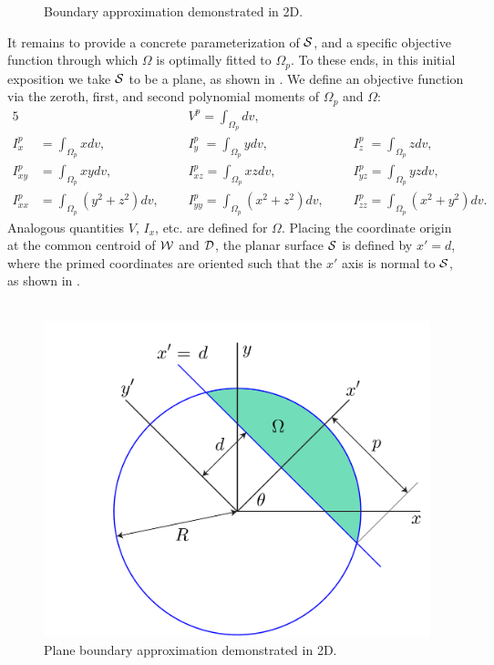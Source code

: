 \begin{figure}[b!]
{		\label{fig:subfigure6}}
	
	\caption{Boundary approximation demonstrated in 2D.}
	\label{fig:figure3}
\end{figure}\noindent
It remains to provide a concrete parameterization of $\mathcal{S}$, and a specific objective function through which $\Omega$ is optimally fitted to $\Omega_p$.  To these ends, in this initial exposition we take $\mathcal{S}$ to be a plane, as shown in . We define an objective function via the zeroth, first, and second polynomial moments of $\Omega_p$ and $\Omega$: 
\begin{alignat}{5}
&{} &&V^p = \int_{\Omega_p}dv, &&{} \\
I_{x\phantom{z}}^p &= \int_{\Omega_p}xdv, &&I_{y\phantom{z}}^p = \int_{\Omega_p}ydv, &&I_{z\phantom{z}}^p = \int_{\Omega_p}zdv, \\
I^p_{xy} &= \int_{\Omega_p}xydv, &&I^p_{xz} = \int_{\Omega_p}xzdv, &&I^p_{yz} = \int_{\Omega_p}yzdv, \\
I^p_{xx} &= \int_{\Omega_p}(y^2 + z^2)dv, \text{\ \ \ \ \ \ }&&I^p_{yy} = \int_{\Omega_p}(x^2 + z^2)dv, \text{\ \ \ \ \ \ }&&I^p_{zz} = \int_{\Omega_p}(x^2 + y^2)dv.
\end{alignat}
Analogous quantities $V$, $I_x$, etc. are defined for $\Omega$.  Placing the coordinate origin at the common centroid of $\mathcal{W}$ and $\mathcal{D}$, the planar surface $\mathcal{S}$ is defined by $x' = d$, where the primed coordinates are oriented such that the $x'$ axis is normal to $\mathcal{S}$, as shown in .\\ \\
\begin{figure}[t!]
	\centering
		\includegraphics[scale=0.3]{media/om/window.pdf}
	\caption{Plane boundary approximation demonstrated in 2D.}
	\label{fig:quad}
\end{figure}\noindent
